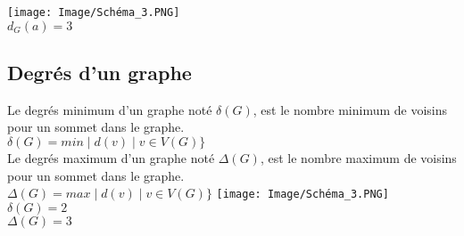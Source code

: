 \documentclass{article}
\begin{document}
\texttt{[image: Image/Schéma\_3.PNG]} \\
$ d_{G}(a)=3 $

\subsection{Degrés d'un graphe}
Le degrés minimum d'un graphe noté $ \delta(G) $, est le nombre minimum de voisins pour un sommet dans le graphe. \\
$ \delta(G) = min \mid d(v) \mid v \in V(G)\} $ \\

Le degrés maximum d'un graphe noté $ \Delta(G) $, est le nombre maximum de voisins pour un sommet dans le graphe. \\
$ \Delta(G) = max \mid d(v) \mid v \in V(G)\} $
\newpage 
\texttt{[image: Image/Schéma\_3.PNG]} \\
$ \delta(G)=2 $ \\
$ \Delta(G)=3 $ \\
\end{document}
